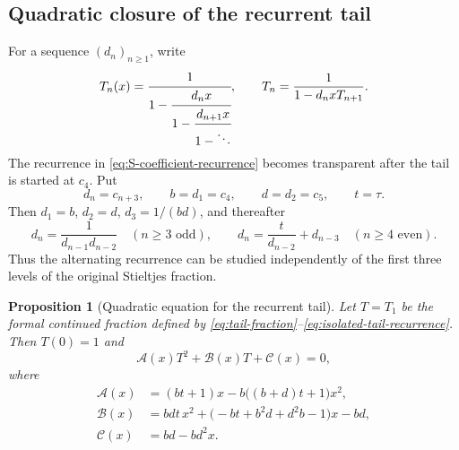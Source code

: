 \documentclass[11pt]{article}
\newtheorem{proposition}{Proposition}
\theoremstyle{remark}
\begin{document}
\subsection{Quadratic closure of the recurrent tail}
\label{subsec:tail-closure}
For a sequence $(d_n)_{n\geq1}$, write
\begin{equation}
 T_n(x)=\cfrac{1}{1-\cfrac{d_nx}{1-\cfrac{d_{n+1}x}{1-\ddots}}},
 \qquad T_n=\frac{1}{1-d_nxT_{n+1}}.
 \label{eq:tail-fraction}
\end{equation}
The recurrence in \eqref{eq:S-coefficient-recurrence} becomes transparent
after the tail is started at $c_4$. Put
\begin{equation}
 d_n=c_{n+3},\qquad b=d_1=c_4,\qquad d=d_2=c_5,\qquad t=\tau.
 \label{eq:tail-reindexing}
\end{equation}
Then $d_1=b$, $d_2=d$, $d_3=1/(bd)$, and thereafter
\begin{equation}
 d_n=\frac1{d_{n-1}d_{n-2}}\quad(n\geq3\text{ odd}),\qquad
 d_n=\frac{t}{d_{n-2}}+d_{n-3}\quad(n\geq4\text{ even}).
 \label{eq:isolated-tail-recurrence}
\end{equation}
Thus the alternating recurrence can be studied independently of the first
three levels of the original Stieltjes fraction.

\begin{proposition}[Quadratic equation for the recurrent tail]
\label{prop:tail-quadratic}
Let $T=T_1$ be the formal continued fraction defined by
\eqref{eq:tail-fraction}--\eqref{eq:isolated-tail-recurrence}. Then $T(0)=1$ and
\begin{equation}
 \mathcal A(x)T^2+\mathcal B(x)T+\mathcal C(x)=0,
 \label{eq:tail-quadratic}
\end{equation}
where
\begin{align}
 \mathcal A(x)&=(bt+1)x-b\bigl((b+d)t+1\bigr)x^2,
 \label{eq:tail-A}\\
 \mathcal B(x)&=bdt\,x^2+\bigl(-bt+b^2d+d^2b-1\bigr)x-bd,
 \label{eq:tail-B}\\
 \mathcal C(x)&=bd-bd^2x.
 \label{eq:tail-C}
\end{align}
\end{proposition}
\end{document}
